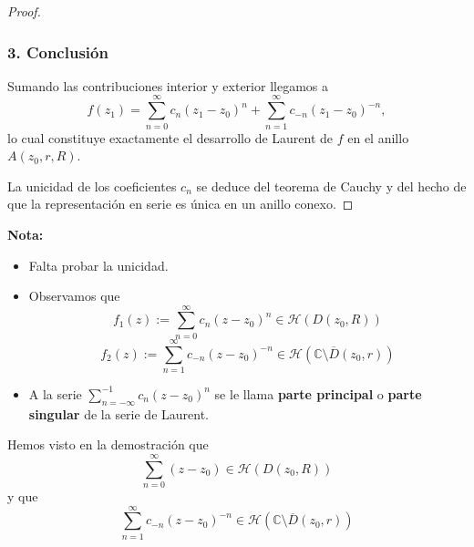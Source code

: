 \begin{proof}
    \medskip

    \subsubsection*{3. Conclusión}

    Sumando las contribuciones interior y exterior llegamos a
    \[
        f(z_1)
        =
        \sum_{n=0}^{\infty} c_n (z_1 - z_0)^n
        +
        \sum_{n=1}^{\infty} c_{-n} (z_1 - z_0)^{-n},
    \]
    lo cual constituye exactamente el desarrollo de Laurent de $f$ en el anillo $A(z_0,r,R)$.

    La unicidad de los coeficientes $c_n$ se deduce del teorema de Cauchy y del hecho de que la representación en serie es única en un anillo conexo.

\end{proof}


\textbf{Nota:}
\begin{itemize}
    \item Falta probar la unicidad.
    \item Observamos que 
    \[
        f_1(z) := \sum_{n=0}^{\infty} c_n (z - z_0)^n \in \mathcal{H}(D(z_0, R))
    \]
    \[
        f_2(z) := \sum_{n=1}^{\infty} c_{-n} (z - z_0)^{-n} \in \mathcal{H}(\mathbb{C} \setminus \overline{D}(z_0, r))
    \]
    \item A la serie $\sum_{n=-\infty}^{-1} c_n (z - z_0)^n$ se le llama \textbf{parte principal} o \textbf{parte singular} de la serie de Laurent.
\end{itemize}

\begin{observación}
    Hemos visto en la demostración que 
    \[
        \sum_{n=0}^{\infty} (z-z_0) \in \mathcal{H}(D(z_0,R))
    \]
    y que 
    \[
        \sum_{n=1}^{\infty} c_{-n} (z - z_0)^{-n} \in \mathcal{H}(\mathbb{C} \setminus \overline{D}(z_0, r))
    \]
\end{observación}

